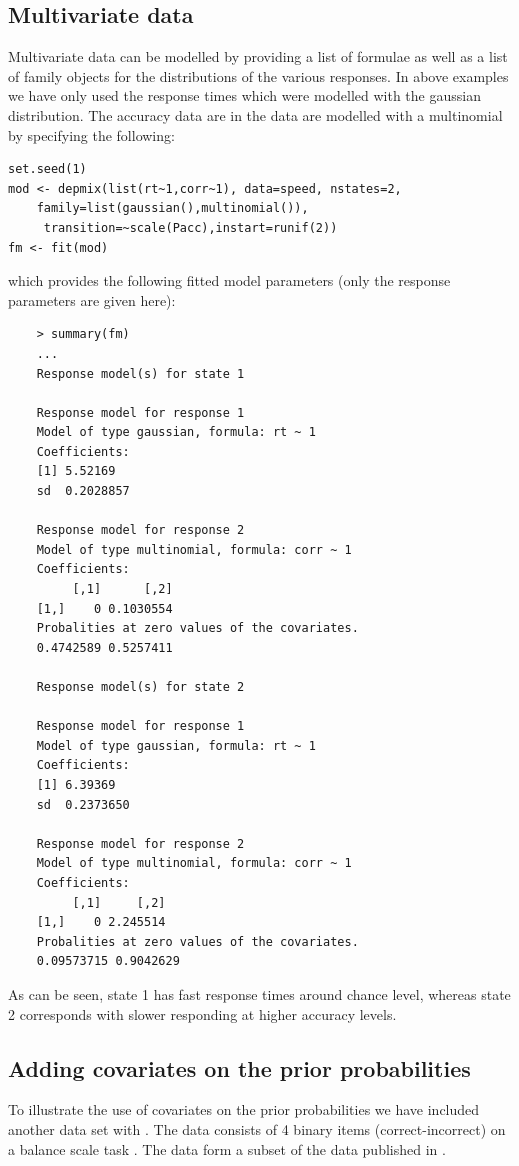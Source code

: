 \documentclass[article]{jss}
\begin{document}
\subsection{Multivariate data}

Multivariate data can be modelled by providing a list of formulae as 
well as a list of family objects for the distributions of the various 
responses. In above examples we have only used the response times 
which were modelled with the gaussian distribution. The accuracy data 
are in the  data are modelled with a multinomial by 
specifying the following: 
\begin{verbatim}
set.seed(1)
mod <- depmix(list(rt~1,corr~1), data=speed, nstates=2, 
	family=list(gaussian(),multinomial()),
	 transition=~scale(Pacc),instart=runif(2))
fm <- fit(mod)
\end{verbatim}
which provides the following fitted model parameters (only the 
response parameters are given here): 
\begin{verbatim}
	> summary(fm)
	...
	Response model(s) for state 1 

	Response model for response 1 
	Model of type gaussian, formula: rt ~ 1
	Coefficients: 
	[1] 5.52169
	sd  0.2028857 

	Response model for response 2 
	Model of type multinomial, formula: corr ~ 1
	Coefficients: 
		 [,1]      [,2]
	[1,]    0 0.1030554
	Probalities at zero values of the covariates.
	0.4742589 0.5257411 

	Response model(s) for state 2 

	Response model for response 1 
	Model of type gaussian, formula: rt ~ 1
	Coefficients: 
	[1] 6.39369
	sd  0.2373650 

	Response model for response 2 
	Model of type multinomial, formula: corr ~ 1
	Coefficients: 
		 [,1]     [,2]
	[1,]    0 2.245514
	Probalities at zero values of the covariates.
	0.09573715 0.9042629 	
\end{verbatim}
As can be seen, state 1 has fast response times around chance level, 
whereas state 2 corresponds with slower responding at higher accuracy 
levels. 


\subsection{Adding covariates on the prior probabilities}

To illustrate the use of covariates on the prior probabilities we have included
another data set with . The  data consists 
of 4 binary items (correct-incorrect) on a balance scale task 
\citet{Siegler1981}. The data form a subset of the data published in 
\citet{Jansen2002}. 
\end{document}

